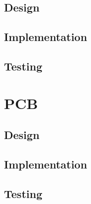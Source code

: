 \subsection{Design}\label{elec/encoder/design}

\subsection{Implementation}\label{elec/encoder/impl}

\subsection{Testing}\label{elec/encoder/test}



\section{PCB}\label{elec/pcb}

\subsection{Design}\label{elec/pcb/design}

\subsection{Implementation}\label{elec/pcb/impl}

\subsection{Testing}\label{elec/pcb/test}

